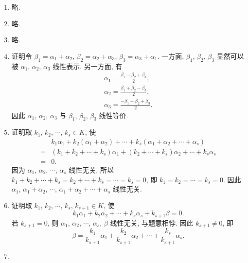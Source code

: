 \documentclass[a4paper, 11pt]{ctexart}
\begin{document}
    \begin{enumerate}
        \item %
            略.
        \item %
            略.
        \item %
            略.
        \item %
            {\heiti 证明}\quad 令 $\beta_1 = \alpha_1 + \alpha_2$, $\beta_2 = \alpha_2 + \alpha_3$, $\beta_3 = \alpha_3 + \alpha_1$.
            一方面, $\beta_1$, $\beta_2$, $\beta_3$ 显然可以被 $\alpha_1$, $\alpha_2$, $\alpha_3$ 线性表示.
            另一方面, 有
            \begin{gather*}
                \alpha_1 = \frac{\beta_1 - \beta_2 + \beta_3}{2}, \\
                \alpha_2 = \frac{\beta_1 + \beta_2 - \beta_3}{2}, \\
                \alpha_3 = \frac{-\beta_1 + \beta_2 + \beta_3}{2}.
            \end{gather*}
            因此 $\alpha_1$, $\alpha_2$, $\alpha_3$ 与 $\beta_1$, $\beta_2$, $\beta_3$ 线性等价.
        \item %
            {\heiti 证明}\quad 取 $k_1$, $k_2$, $\cdots$, $k_s \in K$, 使
            \begin{align*}
                    & k_1\alpha_1 + k_2(\alpha_1 + \alpha_2) + \cdots + k_s(\alpha_1 + \alpha_2 + \cdots + \alpha_s) \\
                ={} & (k_1 + k_2 + \cdots + k_s)\alpha_1 + (k_2 + \cdots + k_s)\alpha_2 + \cdots + k_s\alpha_s \\
                ={} & 0.    
            \end{align*}
            因为 $\alpha_1$, $\alpha_2$, $\cdots$, $\alpha_s$ 线性无关, 所以 $k_1 + k_2 + \cdots + k_s = k_2 + \cdots + k_s = \cdots = k_s = 0$,
            即 $k_1 = k_2 = \cdots = k_s = 0$. 因此 $\alpha_1$, $\alpha_1 + \alpha_2$, $\cdots$, $\alpha_1 + \alpha_2 + \cdots + \alpha_s$ 线性无关.
        \item %
            {\heiti 证明}\quad 取 $k_1$, $k_2$, $\cdots$, $k_s$, $k_{s+1} \in K$, 使
            \[
                k_1\alpha_1 + k_2\alpha_2 + \cdots + k_s\alpha_s + k_{s+1}\beta = 0.    
            \]
            若 $k_{s+1} = 0$, 则 $\alpha_1$, $\alpha_2$, $\cdots$, $\alpha_s$, $\beta$ 线性无关, 与题意相悖. 因此 $k_{s+1} \neq 0$, 即
            \[
                \beta = \frac{k_1}{k_{s+1}}\alpha_1 + \frac{k_2}{k_{s+1}}\alpha_2 + \cdots + \frac{k_s}{k_{s+1}}\alpha_s.    
            \]
        \item %

\end{enumerate}
\end{document}
